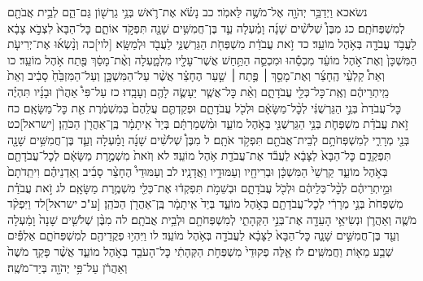 \documentclass[twoside, openany, parskip=half, 11pt]{book}
\begin{document}
נשֹאכא וַיְדַבֵּ֥ר יְהֹוָ֖ה אֶל־מֹשֶׁ֥ה לֵּאמֹֽר׃ כב נָשֹׂ֗א אֶת־רֹ֛אשׁ בְּנֵ֥י גֵרְשׁ֖וֹן גַּם־הֵ֑ם לְבֵ֥ית אֲבֹתָ֖ם לְמִשְׁפְּחֹתָֽם׃ כג מִבֶּן֩ שְׁלֹשִׁ֨ים שָׁנָ֜ה וָמַ֗עְלָה עַ֛ד בֶּן־חֲמִשִּׁ֥ים שָׁנָ֖ה תִּפְקֹ֣ד אוֹתָ֑ם כׇּל־הַבָּא֙ לִצְבֹ֣א צָבָ֔א לַעֲבֹ֥ד עֲבֹדָ֖ה בְּאֹ֥הֶל מוֹעֵֽד׃ כד זֹ֣את עֲבֹדַ֔ת מִשְׁפְּחֹ֖ת הַגֵּרְשֻׁנִּ֑י לַעֲבֹ֖ד וּלְמַשָּֽׂא׃ [לוי]כה וְנָ֨שְׂא֜וּ אֶת־יְרִיעֹ֤ת הַמִּשְׁכָּן֙ וְאֶת־אֹ֣הֶל מוֹעֵ֔ד מִכְסֵ֕הוּ וּמִכְסֵ֛ה הַתַּ֥חַשׁ אֲשֶׁר־עָלָ֖יו מִלְמָ֑עְלָה וְאֶ֨ת־מָסַ֔ךְ פֶּ֖תַח אֹ֥הֶל מוֹעֵֽד׃ כו וְאֵת֩ קַלְעֵ֨י הֶֽחָצֵ֜ר וְאֶת־מָסַ֣ךְ ׀ פֶּ֣תַח ׀ שַׁ֣עַר הֶחָצֵ֗ר אֲשֶׁ֨ר עַל־הַמִּשְׁכָּ֤ן וְעַל־הַמִּזְבֵּ֙חַ֙ סָבִ֔יב וְאֵת֙ מֵֽיתְרֵיהֶ֔ם וְאֶֽת־כׇּל־כְּלֵ֖י עֲבֹדָתָ֑ם וְאֵ֨ת כׇּל־אֲשֶׁ֧ר יֵעָשֶׂ֛ה לָהֶ֖ם וְעָבָֽדוּ׃ כז עַל־פִּי֩ אַהֲרֹ֨ן וּבָנָ֜יו תִּהְיֶ֗ה כׇּל־עֲבֹדַת֙ בְּנֵ֣י הַגֵּרְשֻׁנִּ֔י לְכׇ֨ל־מַשָּׂאָ֔ם וּלְכֹ֖ל עֲבֹדָתָ֑ם וּפְקַדְתֶּ֤ם עֲלֵהֶם֙ בְּמִשְׁמֶ֔רֶת אֵ֖ת כׇּל־מַשָּׂאָֽם׃ כח זֹ֣את עֲבֹדַ֗ת מִשְׁפְּחֹ֛ת בְּנֵ֥י הַגֵּרְשֻׁנִּ֖י בְּאֹ֣הֶל מוֹעֵ֑ד וּמִ֨שְׁמַרְתָּ֔ם בְּיַד֙ אִֽיתָמָ֔ר בֶּֽן־אַהֲרֹ֖ן הַכֹּהֵֽן׃
[ישראל]כט בְּנֵ֖י מְרָרִ֑י לְמִשְׁפְּחֹתָ֥ם לְבֵית־אֲבֹתָ֖ם תִּפְקֹ֥ד אֹתָֽם׃ ל מִבֶּן֩ שְׁלֹשִׁ֨ים שָׁנָ֜ה וָמַ֗עְלָה וְעַ֛ד בֶּן־חֲמִשִּׁ֥ים שָׁנָ֖ה תִּפְקְדֵ֑ם כׇּל־הַבָּא֙ לַצָּבָ֔א לַעֲבֹ֕ד אֶת־עֲבֹדַ֖ת אֹ֥הֶל מוֹעֵֽד׃ לא וְזֹאת֙ מִשְׁמֶ֣רֶת מַשָּׂאָ֔ם לְכׇל־עֲבֹדָתָ֖ם בְּאֹ֣הֶל מוֹעֵ֑ד קַרְשֵׁי֙ הַמִּשְׁכָּ֔ן וּבְרִיחָ֖יו וְעַמּוּדָ֥יו וַאֲדָנָֽיו׃ לב וְעַמּוּדֵי֩ הֶחָצֵ֨ר סָבִ֜יב וְאַדְנֵיהֶ֗ם וִיתֵֽדֹתָם֙ וּמֵ֣יתְרֵיהֶ֔ם לְכׇ֨ל־כְּלֵיהֶ֔ם וּלְכֹ֖ל עֲבֹדָתָ֑ם וּבְשֵׁמֹ֣ת תִּפְקְד֔וּ אֶת־כְּלֵ֖י מִשְׁמֶ֥רֶת מַשָּׂאָֽם׃ לג זֹ֣את עֲבֹדַ֗ת מִשְׁפְּחֹת֙ בְּנֵ֣י מְרָרִ֔י לְכׇל־עֲבֹדָתָ֖ם בְּאֹ֣הֶל מוֹעֵ֑ד בְּיַד֙ אִֽיתָמָ֔ר בֶּֽן־אַהֲרֹ֖ן הַכֹּהֵֽן׃ [ע"כ ישראל]לד וַיִּפְקֹ֨ד מֹשֶׁ֧ה וְאַהֲרֹ֛ן וּנְשִׂיאֵ֥י הָעֵדָ֖ה אֶת־בְּנֵ֣י הַקְּהָתִ֑י לְמִשְׁפְּחֹתָ֖ם וּלְבֵ֥ית אֲבֹתָֽם׃ לה מִבֶּ֨ן שְׁלֹשִׁ֤ים שָׁנָה֙ וָמַ֔עְלָה וְעַ֖ד בֶּן־חֲמִשִּׁ֣ים שָׁנָ֑ה כׇּל־הַבָּא֙ לַצָּבָ֔א לַעֲבֹדָ֖ה בְּאֹ֥הֶל מוֹעֵֽד׃ לו וַיִּהְי֥וּ פְקֻדֵיהֶ֖ם לְמִשְׁפְּחֹתָ֑ם אַלְפַּ֕יִם שְׁבַ֥ע מֵא֖וֹת וַחֲמִשִּֽׁים׃ לז אֵ֤לֶּה פְקוּדֵי֙ מִשְׁפְּחֹ֣ת הַקְּהָתִ֔י כׇּל־הָעֹבֵ֖ד בְּאֹ֣הֶל מוֹעֵ֑ד אֲשֶׁ֨ר פָּקַ֤ד מֹשֶׁה֙ וְאַהֲרֹ֔ן עַל־פִּ֥י יְהֹוָ֖ה בְּיַד־מֹשֶֽׁה׃
\end{document}

